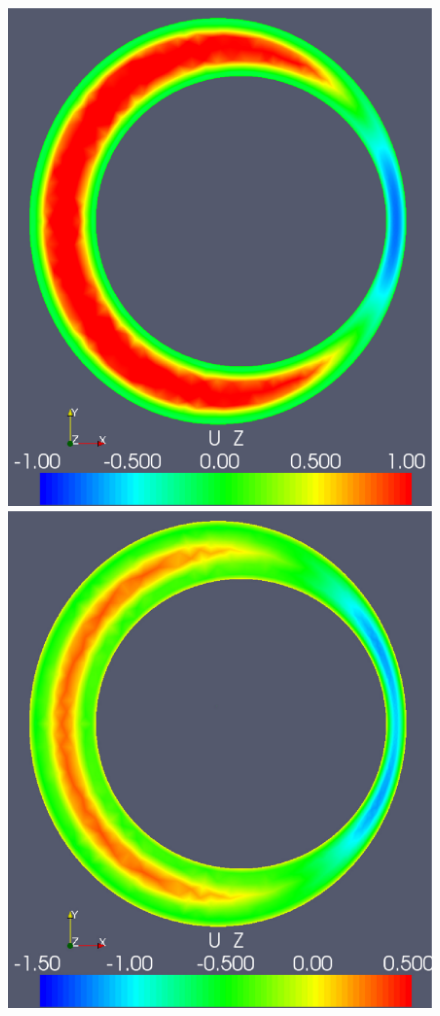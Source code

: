 \begin{figure}
{            \includegraphics[width=\threefigsfull]{chapters/hentschel/pdf/pulse_syrinx_f1_08_syrinx05_sysdia_nmb18.pdf}
            \includegraphics[width=\threefigsfull]{chapters/hentschel/pdf/pulse_syrinx_f1_08_syrinx05_diamin1_nmb25.pdf}}
\end{figure}

